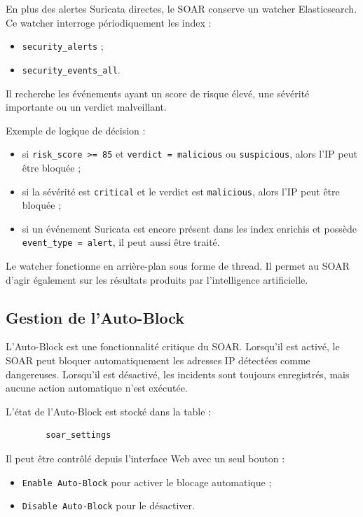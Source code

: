 \documentclass[12pt,a4paper,oneside]{report}
\begin{document}
    En plus des alertes Suricata directes, le SOAR conserve un watcher Elasticsearch. Ce watcher interroge périodiquement les index :
    
    \begin{itemize}
    	\item \texttt{security\_alerts} ;
    	\item \texttt{security\_events\_all}.
    \end{itemize}
    
    Il recherche les événements ayant un score de risque élevé, une sévérité importante ou un verdict malveillant.
    
    Exemple de logique de décision :
    
    \begin{itemize}
    	\item si \texttt{risk\_score >= 85} et \texttt{verdict = malicious} ou \texttt{suspicious}, alors l'IP peut être bloquée ;
    	\item si la sévérité est \texttt{critical} et le verdict est \texttt{malicious}, alors l'IP peut être bloquée ;
    	\item si un événement Suricata est encore présent dans les index enrichis et possède \texttt{event\_type = alert}, il peut aussi être traité.
    \end{itemize}
    
    Le watcher fonctionne en arrière-plan sous forme de thread. Il permet au SOAR d'agir également sur les résultats produits par l'intelligence artificielle.
    
    \subsection{Gestion de l'Auto-Block}
    
    L'Auto-Block est une fonctionnalité critique du SOAR. Lorsqu'il est activé, le SOAR peut bloquer automatiquement les adresses IP détectées comme dangereuses. Lorsqu'il est désactivé, les incidents sont toujours enregistrés, mais aucune action automatique n'est exécutée.
    
    L'état de l'Auto-Block est stocké dans la table :
    
    \begin{lstlisting}
    	soar_settings
    \end{lstlisting}
    
    Il peut être contrôlé depuis l'interface Web avec un seul bouton :
    
    \begin{itemize}
    	\item \texttt{Enable Auto-Block} pour activer le blocage automatique ;
    	\item \texttt{Disable Auto-Block} pour le désactiver.
    \end{itemize}
    
\end{document}
